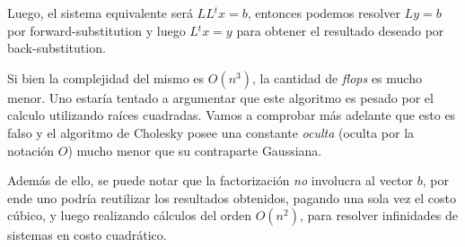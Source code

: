 Luego, el sistema equivalente ser\'a $LL{^t}x = b$, entonces podemos resolver $Ly = b$ por forward-substitution y luego $L{^t}x = y$ para obtener el resultado deseado por back-substitution.

Si bien la complejidad del mismo es $O(n^{3})$, la cantidad de \textit{flops} es mucho menor. Uno estar\'ia tentado a argumentar que este algoritmo es pesado por el calculo utilizando ra\'ices cuadradas. Vamos a comprobar m\'as adelante que esto es falso y el algoritmo de Cholesky posee una constante \textit{oculta} (oculta por la notaci\'on $O$) mucho menor que su contraparte Gaussiana.

Adem\'as de ello, se puede notar que la factorizaci\'on \textit{no} involucra al vector $b$, por ende uno podr\'ia reutilizar los resultados obtenidos, pagando una sola vez el costo c\'ubico, y luego realizando c\'alculos del orden $O(n^{2})$, para resolver infinidades de sistemas en costo cuadr\'atico.

